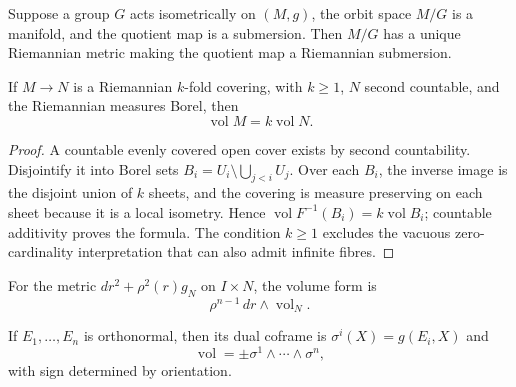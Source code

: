 \begin{remark}
  \label{rem:pet-ch1-ex-2}


  Suppose a group $G$ acts isometrically on $(M,g)$, the orbit space $M/G$ is
  a manifold, and the quotient map is a submersion. Then $M/G$ has a unique
  Riemannian metric making the quotient map a Riemannian submersion.
\end{remark}

\begin{remark}
  \label{rem:pet-ch1-ex-3}


  If $M\to N$ is a Riemannian $k$-fold covering, with $k\ge1$, $N$ second
  countable, and the Riemannian measures Borel, then
  \[
    \operatorname{vol}M=k\operatorname{vol}N.
  \]
\end{remark}
\begin{proof}

  \sketch
  A countable evenly covered open cover exists by second countability.
  Disjointify it into Borel sets
  $B_i=U_i\setminus\bigcup_{j<i}U_j$. Over each $B_i$, the inverse image is
  the disjoint union of $k$ sheets, and the covering is measure preserving on
  each sheet because it is a local isometry. Hence
  $\operatorname{vol}F^{-1}(B_i)=k\operatorname{vol}B_i$; countable
  additivity proves the formula. The condition $k\ge1$ excludes the vacuous
  zero-cardinality interpretation that can also admit infinite fibres.
\end{proof}

\begin{remark}
  \label{rem:pet-ch1-ex-4}


  For the metric $dr^2+\rho^2(r)g_N$ on $I\times N$, the volume form is
  \[
    \rho^{n-1}\,dr\wedge\operatorname{vol}_N.
  \]
\end{remark}

\begin{remark}
  \label{rem:pet-ch1-ex-5}


  If $E_1,\ldots,E_n$ is orthonormal, then its dual coframe is
  $\sigma^i(X)=g(E_i,X)$ and
  \[
    \operatorname{vol}=\pm\sigma^1\wedge\cdots\wedge\sigma^n,
  \]
  with sign determined by orientation.
\end{remark}

